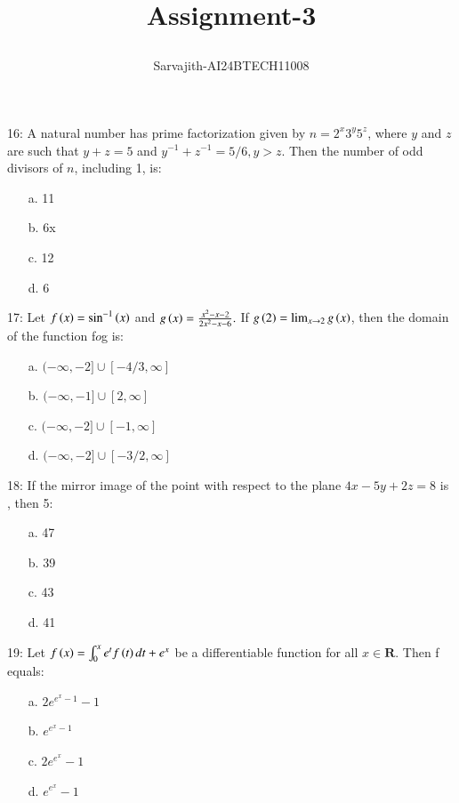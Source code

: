 \documentclass[journal,12pt,twocolumn]{IEEEtran}
\title{Assignment-3

}
\author{Sarvajith-AI24BTECH11008}
\theoremstyle{remark}
\begin{document}
\maketitle


16: A natural number has prime factorization given by $n = 2^x3^y5^z$, where $y$ and $z$ are such that $y + z = 5$ and $y^{-1} + z^{-1} = 5/6, y>z$. Then the number of odd divisors of $n$, including 1, is:
\begin{multicols}{2}
\begin{enumerate}
    \item [a.] 11
    \item [b.] 6x
	    \columnbreak
    \item [c.] 12
    \item [d.] 6   
\end{enumerate}
\end{multicols}
17: Let $f\left(x\right) = \sin ^{-1} \left(x\right)$ and $g\left(x\right) = \frac{x^2-x-2}{2x^2-x-6}.$ If $g\left(2\right) =\lim_{x\rightarrow2}g\left(x\right)$, then the domain of the function f$o$g is:
\begin{multicols}{2}
\begin{enumerate}
    \item [a.] $(-\infty,-2]\cup[-4/3,\infty]$
    \item [b.] $(-\infty,-1]\cup[2,\infty]$
	    \columnbreak
    \item [c.] $(-\infty,-2]\cup[-1,\infty]$
    \item [d.] $(-\infty,-2]\cup[-3/2,\infty]$
\end{enumerate}
\end{multicols}
18: If the mirror image of the point  with respect to the plane $4x-5y+2z=8$ is \brak{\alpha,\beta,\gamma}, then
5\brak{\alpha+\beta+\gamma}:
\begin{multicols}{2}
\begin{enumerate}
    \item [a.] 47
    \item [b.] 39
	    \columnbreak
    \item [c.] 43
    \item [d.] 41  
\end{enumerate}
\end{multicols}
19: Let $f\left(x\right)=\int_0 ^x e^t f\left(t\right)dt + e^x $ be a differentiable function for all $x\in \mathbf{R}$. Then f equals:
\begin{multicols}{2}
\begin{enumerate}
    \item [a.] $2e^{e^x-1}-1$
    \item [b.] $e^{e^x-1}$
	    \columnbreak
    \item [c.] $2e^{e^x}-1$
    \item [d.] $e^{e^x}-1$
\end{enumerate}
\end{multicols}
\end{document}
